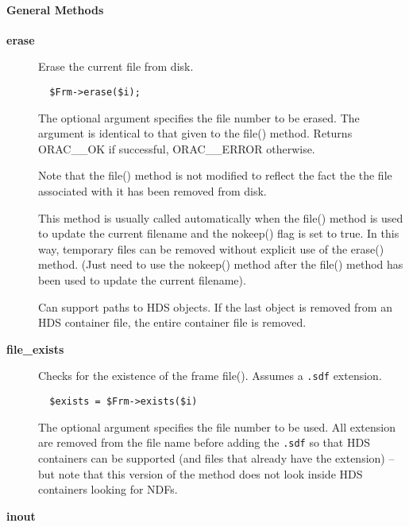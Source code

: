 \paragraph*{General Methods\label{ORAC::Frame::NDF_General_Methods}}
\begin{description}

\item[\textbf{erase}] \mbox{}

Erase the current file from disk.

\begin{verbatim}
  $Frm->erase($i);
\end{verbatim}


The optional argument specifies the file number to be erased.
The argument is identical to that given to the file() method.
Returns ORAC\_\_OK if successful, ORAC\_\_ERROR otherwise.



Note that the file() method is not modified to reflect the
fact the the file associated with it has been removed from disk.



This method is usually called automatically when the file()
method is used to update the current filename and the nokeep()
flag is set to true. In this way, temporary files can be removed
without explicit use of the erase() method. (Just need to
use the nokeep() method after the file() method has been used
to update the current filename).



Can support paths to HDS objects. If the last object is removed from
an HDS container file, the entire container file is removed.


\item[\textbf{file\_exists}] \mbox{}

Checks for the existence of the frame file(). Assumes a \texttt{.sdf}
extension.

\begin{verbatim}
  $exists = $Frm->exists($i)
\end{verbatim}


The optional argument specifies the file number to be used.
All extension are removed from the file name before adding the
\texttt{.sdf} so that HDS containers can be supported (and files
that already have the extension)  -- but note that
this version of the method does not look inside HDS containers
looking for NDFs.


\item[\textbf{inout}] \mbox{}


\end{description}

